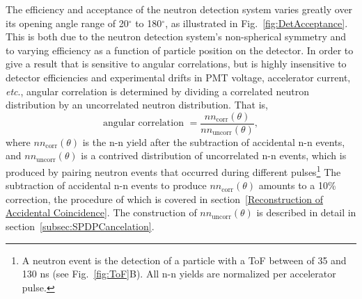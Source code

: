
The efficiency and acceptance of the neutron detection system varies greatly over its opening angle range of 20$^{\circ}$ to 180$^{\circ}$, as illustrated in Fig.~\ref{fig:DetAcceptance}.
This is both due to the neutron detection system's non-spherical symmetry and to varying efficiency as a function of particle position on the detector.
In order to give a result that is sensitive to angular correlations, but is highly insensitive to detector efficiencies and experimental drifts in PMT voltage, accelerator current, \emph{etc}., angular correlation is determined by dividing a correlated neutron distribution by an uncorrelated neutron distribution. That is,
\begin{equation}
\label{eq:angularCorr}
\text{angular correlation }  = \frac{nn_{\text{corr}}(\theta)}{nn_{\text{uncorr}}(\theta)},
\end{equation}
where $nn_{\text{corr}}(\theta)$ is the n-n yield after the subtraction of accidental n-n events, and $nn_{\text{uncorr}}(\theta)$ is a contrived distribution of uncorrelated n-n events, which is produced by pairing neutron events that occurred during different pulses\footnote{A neutron event is the detection of a particle with a ToF between of 35 and 130 ns (see Fig.~\ref{fig:ToF}B). All n-n yields are normalized per accelerator pulse.} The subtraction of accidental n-n events to produce $nn_{\text{corr}}(\theta)$ amounts to a 10\% correction, the procedure of which is covered in section~\ref{Reconstruction of Accidental Coincidence}. The construction of $nn_{\text{uncorr}}(\theta)$ is described in detail in section~\ref{subsec:SPDPCancelation}.

